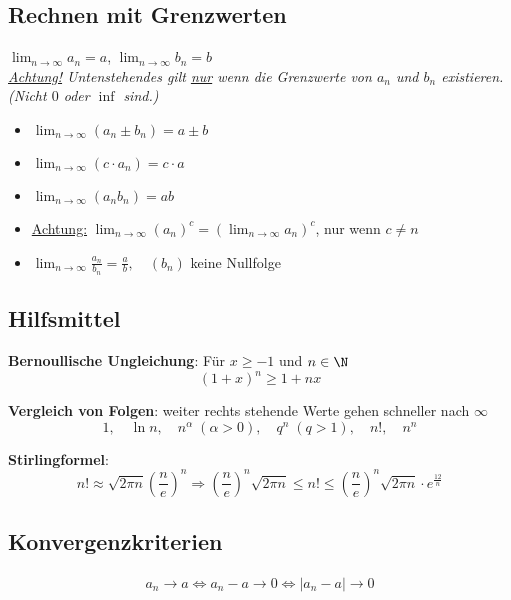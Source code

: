 \subsection{Rechnen mit Grenzwerten}
$\lim_{n \to \infty} a_n = a$, $\lim_{n \to \infty} b_n = b$\\
\emph{\underline{Achtung!} Untenstehendes gilt \underline{nur} wenn die Grenzwerte von $a_n$ und $b_n$ existieren. (Nicht $0$ oder $\inf$ sind.)}
\begin{itemize}
  \item $\lim_{n \to \infty} (a_n \pm b_n) = a \pm b$
  \item $\lim_{n \to \infty} (c \cdot a_n) = c \cdot a$
  \item $\lim_{n \to \infty} (a_n b_n) = ab$
  \item \underline{Achtung:} $\lim_{n \to \infty} (a_n)^c = (\lim_{n \to
  \infty} a_n)^c$, nur wenn $c \neq n$
  \item $\lim_{n \to \infty} \frac{a_n}{b_n} = \frac{a}{b}, \quad (b_n)$ keine
  Nullfolge
\end{itemize}

\subsection{Hilfsmittel}
\textbf{Bernoullische Ungleichung}: Für $x \geq -1$ und $n \in \N$
\[
	(1+x)^n \geq 1 + nx
\]


\textbf{Vergleich von Folgen}: weiter rechts stehende Werte gehen schneller nach
$\infty$
\[
	1, \quad \ln n, \quad n^\alpha \; (\alpha > 0), \quad q^n \; (q > 1), \quad n!,
	\quad n^n
\]

\textbf{Stirlingformel}:
\[
	n! \approx \sqrt{2 \pi n} \left (\frac{n}{e} \right )^n
	\Rightarrow \left ( \frac{n}{e} \right )^n \sqrt{2 \pi n} \leq n! \leq \left (
	\frac{n}{e} \right )^n \sqrt{2 \pi n} \cdot e^\frac{12}{n}
\]

\subsection{Konvergenzkriterien}
\begin{align*}
	a_n \to a \Leftrightarrow a_n - a \to 0 \Leftrightarrow |a_n - a| \to 0
\end{align*}
	
